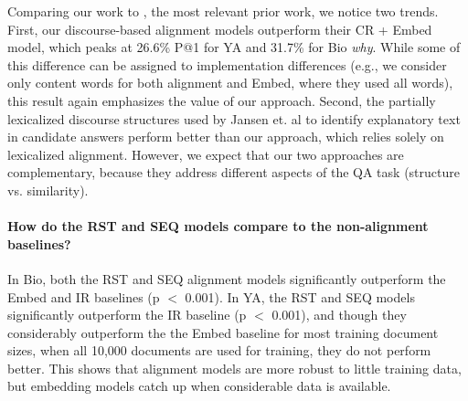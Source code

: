 Comparing our work to \citet{jansen14}, the most relevant prior work, we notice two trends.
First, our discourse-based alignment models outperform their CR + Embed model, which peaks at 26.6\% P@1 for YA and 31.7\% for Bio \emph{why}. While some of this difference can be assigned to implementation differences (e.g., we consider only content words for both alignment and Embed, where they used all words), this result again emphasizes the value of our approach.
Second, the partially lexicalized discourse structures used by Jansen et. al to identify explanatory text in candidate answers perform better than our approach, which relies solely on lexicalized alignment. However, we expect that our two approaches are complementary, because they address different aspects of the QA task (structure vs. similarity).

\paragraph{How do the RST and SEQ models compare to the non-alignment baselines?}


In Bio, both the RST and SEQ alignment models significantly outperform the Embed and IR baselines (p $<$ 0.001).  %
In YA, the RST and SEQ models significantly outperform the IR baseline (p $<$ 0.001), and though 
they considerably outperform the the Embed baseline for most training document sizes, when all 10,000 documents are used for training, they do not perform  better.  
This shows that alignment models are more robust to little training data, but embedding models catch up when considerable data is available.

